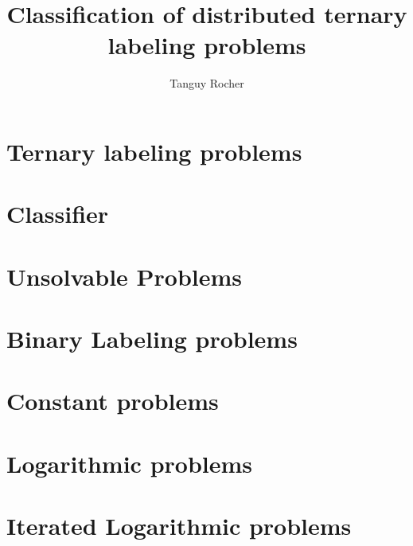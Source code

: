 
\title{Classification of distributed ternary labeling problems}
\author{Tanguy Rocher}



\maketitle

\newpage
\chapter{Ternary labeling problems}


\newpage
\chapter{Classifier}


%
\newpage
\chapter{Unsolvable Problems}


\newpage
\chapter{Binary Labeling problems}


\newpage
\chapter{Constant problems}


\newpage
\chapter{Logarithmic problems}


\newpage
\chapter{Iterated Logarithmic problems}




